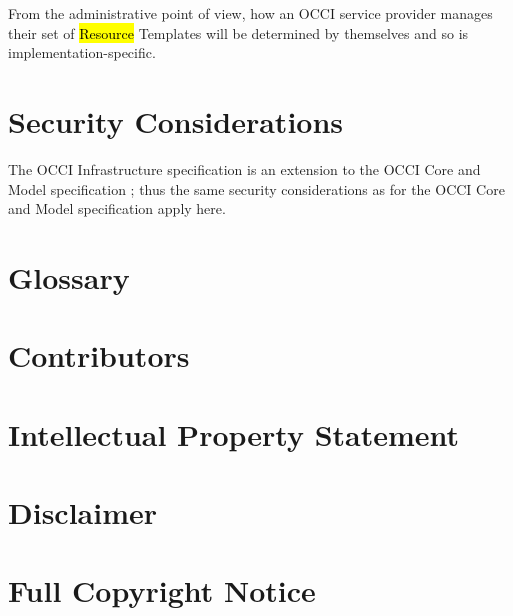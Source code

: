 \documentclass[10pt,a4paper]{article}
\begin{document}

From the administrative point of view, how an OCCI service provider manages their set of 
\hl{Resource} Templates will be determined by themselves and so is implementation-specific.


\section{Security Considerations}
The OCCI Infrastructure specification is an extension to the OCCI Core and Model
specification \cite{occi:core}; thus the same security considerations as for
the OCCI Core and Model specification apply here.

\section{Glossary}
\label{sec:glossary}


\section{Contributors}


\section{Intellectual Property Statement}


\section{Disclaimer}


\section{Full Copyright Notice}




\end{document}
